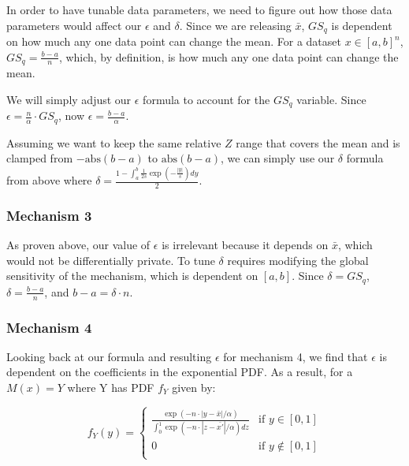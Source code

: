 \documentclass[12pt]{article}
\begin{document}
\bigskip

In order to have tunable data parameters, we need to figure out how those data parameters would affect our $\epsilon$ and $\delta$. Since we are releasing $\bar{x}$, $GS_q$ is dependent on how much any one data point can change the mean. For a dataset $x \in [a, b]^n$, $GS_q = \frac{b - a}{n}$, which, by definition, is how much any one data point can change the mean.

\medskip

We will simply adjust our $\epsilon$ formula to account for the $GS_q$ variable. Since $\epsilon = \frac{n}{\alpha} \cdot GS_q$, now $\epsilon = \frac{b-a}{\alpha}$.

\medskip

Assuming we want to keep the same relative $Z$ range that covers the mean and is clamped from $-\text{abs}(b-a)$ to $\text{abs}(b-a)$, we can simply use our $\delta$ formula from above where $\delta = \frac{1 - \int_{a}^b \frac{1}{2s} \exp(-\frac{|y|}{s}) dy}{2}$.

\subsubsection*{Mechanism 3}

\noindent

As proven above, our value of $\epsilon$ is irrelevant because it depends on $\bar{x}$, which would not be differentially private. To tune $\delta$ requires modifying the global sensitivity of the mechanism, which is dependent on $[a, b]$. Since $\delta = GS_q$, $\delta = \frac{b-a}{n}$, and $b - a = \delta \cdot n$.

\subsubsection*{Mechanism 4}

\noindent

Looking back at our formula and resulting $\epsilon$ for mechanism 4, we find that $\epsilon$ is dependent on the coefficients in the exponential PDF. As a result, for a $M(x) = Y$ where Y has PDF $f_Y$ given by:

$$
f_Y(y) =
\begin{cases}
\frac{\exp(-n \cdot |y - \bar{x}|/\alpha)}{\int_0^1 \exp(-n \cdot |z-\bar{x'}|/\alpha) dz} & \text{if } y \in [0, 1] \\
0 & \text{if } y \not\in [0, 1] \\
\end{cases}
$$
\end{document}
